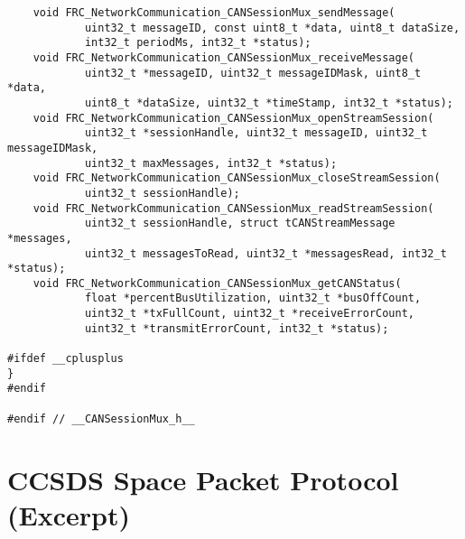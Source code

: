 \documentclass[12pt]{article}
\begin{document}
\begin{verbatim}
    void FRC_NetworkCommunication_CANSessionMux_sendMessage(
            uint32_t messageID, const uint8_t *data, uint8_t dataSize, 
            int32_t periodMs, int32_t *status);
    void FRC_NetworkCommunication_CANSessionMux_receiveMessage(
            uint32_t *messageID, uint32_t messageIDMask, uint8_t *data, 
            uint8_t *dataSize, uint32_t *timeStamp, int32_t *status);
    void FRC_NetworkCommunication_CANSessionMux_openStreamSession(
            uint32_t *sessionHandle, uint32_t messageID, uint32_t messageIDMask, 
            uint32_t maxMessages, int32_t *status);
    void FRC_NetworkCommunication_CANSessionMux_closeStreamSession(
            uint32_t sessionHandle);
    void FRC_NetworkCommunication_CANSessionMux_readStreamSession(
            uint32_t sessionHandle, struct tCANStreamMessage *messages, 
            uint32_t messagesToRead, uint32_t *messagesRead, int32_t *status);
    void FRC_NetworkCommunication_CANSessionMux_getCANStatus(
            float *percentBusUtilization, uint32_t *busOffCount, 
            uint32_t *txFullCount, uint32_t *receiveErrorCount, 
            uint32_t *transmitErrorCount, int32_t *status);

#ifdef __cplusplus
}
#endif

#endif // __CANSessionMux_h__
\end{verbatim}
\newpage
\section{CCSDS Space Packet Protocol (Excerpt)}

\end{document}
